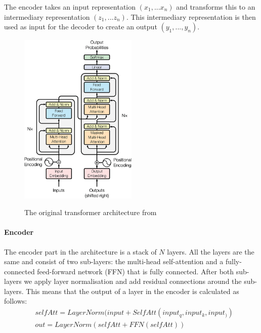 The encoder takes an input representation $(x_1,...x_n)$ and transforms this to an intermediary representation $(z_1,...z_n)$. This intermediary representation is then used as input for the decoder to create an output $(y_1,...,y_n)$.

\begin{figure}[h]
\caption{The original transformer architecture from \cite{vaswani_attention_2017}}
\centering
\includegraphics[width=0.5\textwidth]{../imgs/transformer.png}
\label{fig:transformer-architecture}
\end{figure}

\paragraph{Encoder}
The encoder part in the architecture is a stack of $N$ layers. All the layers are the same and consist of two sub-layers: the multi-head self-attention and a fully-connected feed-forward network (FFN) that is fully connected. After both sub-layers we apply layer normalisation\cite{ba_layer_2016} and add residual connections\cite{he_deep_2015} around the sub-layers. This means that the output of a layer in the encoder is calculated as follows: 
\begin{align*}
&selfAtt = LayerNorm(input + SelfAtt(input_q, input_k, input_))\\
&out = LayerNorm(selfAtt + FFN(selfAtt))
\end{align*}


